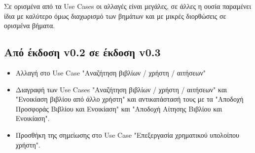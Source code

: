 \documentclass[12pt,a4paper]{article}
\begin{document}
Σε ορισμένα από τα Use Cases οι αλλαγές είναι μεγάλες, σε άλλες η ουσία παραμένει ίδια με καλύτερο όμως διαχωρισμό των βημάτων και με μικρές διορθώσεις σε ορισμένα βήματα.

\subsection{Από έκδοση v0.2 σε έκδοση v0.3}
\begin{itemize}
    \item Αλλαγή στο Use Case "Αναζήτηση βιβλίων / χρήστη / αιτήσεων"
    \item Διαγραφή των Use Cases "Αναζήτηση βιβλίων / χρήστη / αιτήσεων" και "Ενοικίαση βιβλίου από άλλο χρήστη" και αντικατάστασή τους με τα "Αποδοχή Προσφοράς Βιβλίου και Ενοικίαση" και "Αποδοχή Αίτησης Βιβλίου και Ενοικίαση".
    \item Προσθήκη της σημείωσης στο Use Case "Επεξεργασία χρηματικού υπολοίπου χρήστη".
\end{itemize}
\end{document}
